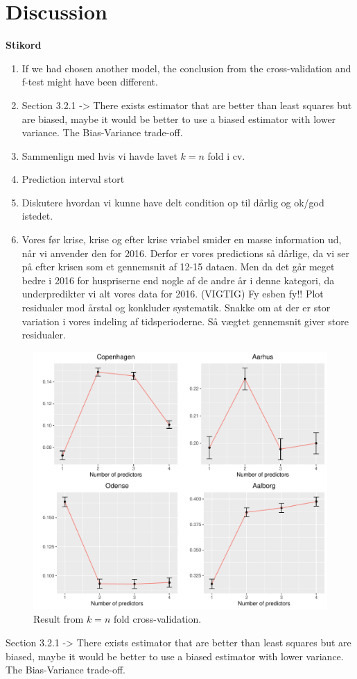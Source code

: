 \chapter{Discussion}
\textbf{Stikord}
\begin{enumerate}
    \item If we had chosen another model, the conclusion from the cross-validation and f-test might have been different.
    \item Section 3.2.1 -> There exists estimator that are better than least squares but are biased, maybe it would be better to use a biased estimator with lower variance. The Bias-Variance trade-off. 
    \item Sammenlign med hvis vi havde lavet $k=n$ fold i cv.
    \item Prediction interval stort
    \item Diskutere hvordan vi kunne have delt condition op til dårlig og ok/god istedet.
    \item Vores før krise, krise og efter krise vriabel smider en masse information ud, når vi anvender den for 2016. Derfor er vores predictions så dårlige, da vi ser på efter krisen som et gennemsnit af 12-15 dataen. Men da det går meget bedre i 2016 for huspriserne end nogle af de andre år i denne kategori, da underpredikter vi alt vores data for 2016. (VIGTIG) Fy esben fy!! Plot residualer mod årstal og konkluder systematik. Snakke om at der er stor variation i vores indeling af tidsperioderne. Så vægtet gennemsnit giver store residualer. 
\end{enumerate}

\begin{figure}[H]
        \centering
      \includegraphics[width = 0.7 \textwidth]{figures/Nanna/k=n.pdf}
      \caption{Result from $k = n$ fold cross-validation.}
      \label{fig:error_cont}
\end{figure}



Section 3.2.1 -> There exists estimator that are better than least squares but are biased, maybe it would be better to use a biased estimator with lower variance. The Bias-Variance trade-off. 